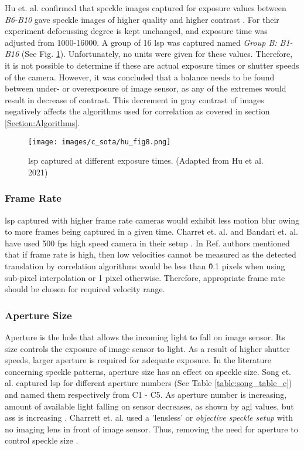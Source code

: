     \vspace{5mm}

    \noindent Hu et. al. confirmed that speckle images captured for exposure values between \emph{B6-B10} gave speckle images of higher quality and higher contrast \noindent \cite{hu}. For their experiment defocussing degree is kept unchanged, and exposure time was adjusted from 1000-16000. A group of 16 \gls{lsp} was captured named \emph{Group B: B1-B16} (See Fig. \ref{fig:hu_fig8}). Unfortunately, no units were given for these values. Therefore, it is not possible to determine if these are actual exposure times or shutter speeds of the camera. However, it was concluded that a balance needs to be found between under- or overexposure of image sensor, as any of the extremes would result in decrease of contrast. This decrement in gray contrast of images negatively affects the algorithms used for correlation as covered in section \ref{Section:Algorithms}.

    \begin{figure}[h]
        \centering
        \texttt{[image: images/c\_sota/hu\_fig8.png]}
        \caption{\gls{lsp} captured at different exposure times. (Adapted from Hu et al. 2021) \cite{hu}}
        \label{fig:hu_fig8}
    \end{figure}

    \subsubsection{Frame Rate}\label{Subsubsection:Frame_Rate}
    \Gls{lsp} captured with higher frame rate cameras would exhibit less motion blur owing to more frames being captured in a given time. Charret et. al. and Bandari et. al. have used 500 \gls{fps} high speed camera in their setup \cite{charrett_2018} \cite{bandari}. In Ref. \cite{charrett_mars} authors mentioned that if frame rate is high, then low velocities cannot be measured as the detected translation by correlation algorithms would be less than \~0.1 pixels when using sub-pixel interpolation or 1 pixel otherwise. Therefore, appropriate frame rate should be chosen for required velocity range.

    
    \subsubsection{Aperture Size}
    Aperture is the hole that allows the incoming light to fall on image sensor. Its size controls the exposure of image sensor to light. As a result of higher shutter speeds, larger aperture is required for adequate exposure. In the literature concerning speckle patterns, aperture size has an effect on speckle size. Song et. al. captured \gls{lsp} for different aperture numbers (See Table \ref{table:song_table_c}) and named them respectively from C1 - C5. As aperture number is increasing, amount of available light falling on sensor decreases, as shown by \gls{agl} values, but \gls{ass} is increasing \cite{song}. Charrett et. al. used a 'lensless' or \emph{objective speckle setup} with no imaging lens in front of image sensor. Thus, removing the need for aperture to control speckle size \cite{charrett_2018, francis_autonomous}.
    

